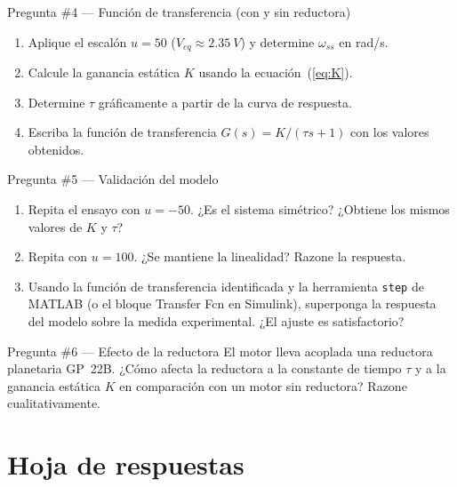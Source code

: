 \documentclass[12pt,a4paper]{article}
\begin{document}
\begin{pregunta}{Pregunta \#4 — Función de transferencia (con y sin reductora)}
  \begin{enumerate}[label=\alph*)]
    \item Aplique el escalón $u=50$ ($V_{eq}\approx\SI{2.35}{V}$) y
          determine $\omega_{ss}$ en rad/s.
    \item Calcule la ganancia estática $K$ usando la ecuación~(\ref{eq:K}).
    \item Determine $\tau$ gráficamente a partir de la curva de respuesta.
    \item Escriba la función de transferencia $G(s) = K/(\tau s + 1)$ con los
          valores obtenidos.
  \end{enumerate}
\end{pregunta}

\begin{pregunta}{Pregunta \#5 — Validación del modelo}
  \begin{enumerate}[label=\alph*)]
    \item Repita el ensayo con $u=-50$. ¿Es el sistema simétrico?
          ¿Obtiene los mismos valores de $K$ y $\tau$?
    \item Repita con $u=100$. ¿Se mantiene la linealidad? Razone la respuesta.
    \item Usando la función de transferencia identificada y la herramienta
          \texttt{step} de MATLAB (o el bloque Transfer Fcn en Simulink),
          superponga la respuesta del modelo sobre la medida experimental.
          ¿El ajuste es satisfactorio?
  \end{enumerate}
\end{pregunta}

\begin{pregunta}{Pregunta \#6 — Efecto de la reductora}
  El motor lleva acoplada una reductora planetaria GP~22B. ¿Cómo afecta
  la reductora a la constante de tiempo $\tau$ y a la ganancia estática $K$
  en comparación con un motor sin reductora? Razone cualitativamente.
\end{pregunta}

\section*{Hoja de respuestas}
\end{document}
